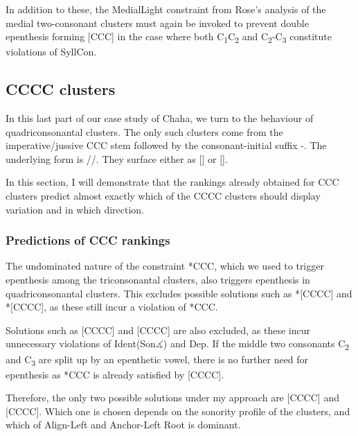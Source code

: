 \documentclass[12pt]{article}
\begin{document}
In addition to these, the {\sc *MedialLight} constraint from Rose's analysis of the medial two-consonant clusters must again be invoked to prevent double epenthesis forming [CCC] in the case where both C\textsubscript{1}C\textsubscript{2} and C\textsubscript{2}-C\textsubscript{3} constitute violations of {\sc SyllCon}.


\subsection{CCCC clusters}

In this last part of our case study of Chaha, we turn to the behaviour of quadriconsonantal clusters. The only such clusters come from the imperative/jussive CCC stem followed by the consonant-initial suffix -. The underlying form is //. They surface either as [] or [].

In this section, I will demonstrate that the rankings already obtained for CCC clusters predict almost exactly which of the CCCC clusters should display variation and in which direction.

\subsubsection{Predictions of CCC rankings}

The undominated nature of the constraint *CCC, which we used to trigger epenthesis among the triconsonantal clusters, also triggers epenthesis in quadriconsonantal clusters.
This excludes possible solutions such as *[CCCC] and *[CCCC], as these still incur a violation of *CCC.

Solutions such as [CCCC] and [CCCC] are also excluded, as these incur unnecessary violations of {\sc Ident(Son$\measuredangle$)} and {\sc Dep}. If the middle two consonants C\textsubscript{2} and C\textsubscript{3} are split up by an epenthetic vowel, there is no further need for epenthesis as *CCC is already satisfied by [CCCC].

Therefore, the only two possible solutions under my approach are [CCCC] and [CCCC]. Which one is chosen depends on the sonority profile of the clusters, and which of {\sc Align-Left} and {\sc Anchor-Left Root} is dominant.
\end{document}
